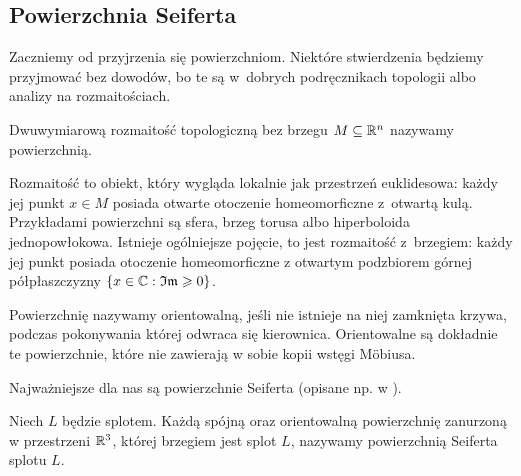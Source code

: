 
\subsection{Powierzchnia Seiferta}
Zaczniemy od przyjrzenia się powierzchniom.
Niektóre stwierdzenia będziemy przyjmować bez dowodów, bo te są w~dobrych podręcznikach topologii albo analizy na rozmaitościach.

\begin{definition}
%
    Dwuwymiarową rozmaitość topologiczną bez brzegu $M \subseteq \mathbb R^n$ nazywamy powierzchnią.
\end{definition}

Rozmaitość to obiekt, który wygląda lokalnie jak przestrzeń euklidesowa: każdy jej punkt $x \in M$ posiada otwarte otoczenie homeomorficzne z~otwartą kulą.
Przykładami powierzchni są sfera, brzeg torusa albo hiperboloida jednopowłokowa.
Istnieje ogólniejsze pojęcie, to jest rozmaitość z~brzegiem: każdy jej punkt posiada otoczenie homeomorficzne z otwartym podzbiorem górnej półpłaszczyzny $\{x \in \mathbb C: \mathfrak {Im} \geqslant 0\}$.


Powierzchnię nazywamy orientowalną, jeśli nie istnieje na niej zamknięta krzywa, podczas pokonywania której odwraca się kierownica.
%
Orientowalne są dokładnie te powierzchnie, które nie zawierają w sobie kopii wstęgi Möbiusa.

%
Najważniejsze dla nas są powierzchnie Seiferta (opisane np. w \cite[s. 46-72]{kawauchi1996}).

\begin{definition}
    Niech $L$ będzie splotem.
    Każdą spójną oraz orientowalną powierzchnię zanurzoną w przestrzeni $\mathbb R^3$, której brzegiem jest splot $L$, nazywamy powierzchnią Seiferta splotu $L$.
\end{definition}


